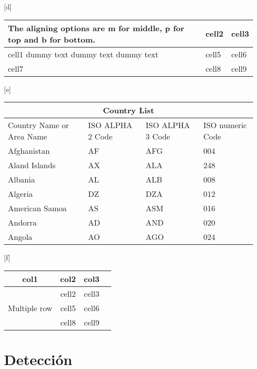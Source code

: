 \begin{center}[d]
\begin{tabular}{ | b{5cm} | m{2cm}| m{2cm} | } 
\hline
The aligning options are m for middle, p for top and b for bottom.& cell2 & cell3 \\ 
\hline
cell1 dummy text dummy text dummy text & cell5 & cell6 \\ 
\hline
cell7 & cell8 & cell9 \\ 
\hline
\end{tabular}
\end{center}

\begin{center}[e]
\begin{tabular}{ |p{3cm}||p{3cm}|p{3cm}|p{3cm}|  }
 \hline
 \multicolumn{4}{|c|}{Country List} \\
 \hline
 Country Name     or Area Name& ISO ALPHA 2 Code &ISO ALPHA 3 Code&ISO numeric Code\\
 \hline
 Afghanistan   & AF    &AFG&   004\\
 Aland Islands&   AX  & ALA   &248\\
 Albania &AL & ALB&  008\\
 Algeria    &DZ & DZA&  012\\
 American Samoa&   AS  & ASM&016\\
 Andorra& AD  & AND   &020\\
 Angola& AO  & AGO&024\\
 \hline
\end{tabular}
\end{center}


\begin{center}[f]
\begin{tabular}{ |c|c|c|c| } 
\hline
col1 & col2 & col3 \\
\hline
\multirow{3}{4em}{Multiple row} & cell2 & cell3 \\ 
& cell5 & cell6 \\ 
& cell8 & cell9 \\ 
\hline
\end{tabular}
\end{center}

\section{Detección}



